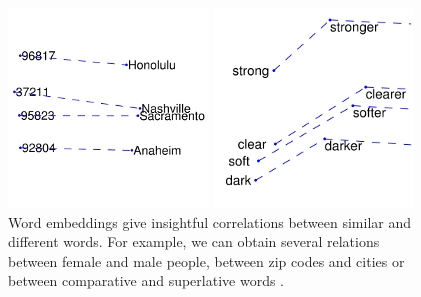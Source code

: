 \begin{figure}[h]
\begin{minipage}{.3\textwidth}
  \includegraphics[width=\linewidth]{images/glove_cz}
\end{minipage}
\begin{minipage}{.3\textwidth}
  \centering
  \includegraphics[width=\linewidth]{images/glove_cs}
\end{minipage}
\caption{Word embeddings give insightful correlations between similar and different words. For example, we can obtain several relations between female and male people, between zip codes and cities or between comparative and superlative words \cite{pennington2014glove}.}
\label{fig:glove}
\end{figure}

